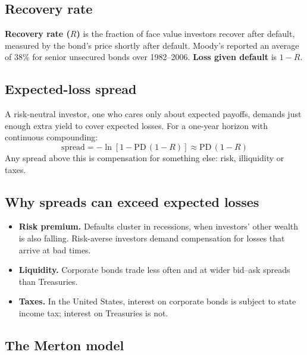 \subsection{Recovery rate}

\textbf{Recovery rate ($R$)} is the fraction of face value investors recover after default, measured by the bond's price shortly after default. Moody's reported an average of 38\% for senior unsecured bonds over 1982--2006. \textbf{Loss given default} is $1 - R$.

\subsection{Expected-loss spread}

A risk-neutral investor, one who cares only about expected payoffs, demands just enough extra yield to cover expected losses. For a one-year horizon with continuous compounding:
\begin{equation}
  \text{spread} = -\ln\!\left[1 - \mathrm{PD}\,(1 - R)\right] \approx \mathrm{PD}\,(1 - R)
  \label{eq:18-el}
\end{equation}
Any spread above this is compensation for something else: risk, illiquidity or taxes.

\subsection{Why spreads can exceed expected losses}

\begin{itemize}
  \item \textbf{Risk premium.} Defaults cluster in recessions, when investors' other wealth is also falling. Risk-averse investors demand compensation for losses that arrive at bad times.
  \item \textbf{Liquidity.} Corporate bonds trade less often and at wider bid--ask spreads than Treasuries.
  \item \textbf{Taxes.} In the United States, interest on corporate bonds is subject to state income tax; interest on Treasuries is not.
\end{itemize}

\subsection{The Merton model}

